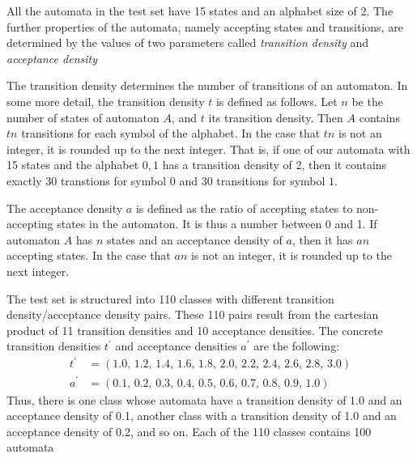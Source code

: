 All the automata in the test set have 15 states and an alphabet size of 2. The further properties of the automata, namely accepting states and transitions, are determined by the values of two parameters called \textit{transition density} and \textit{acceptance density}

The transition density determines the number of transitions of an automaton. In some more detail, the transition density $t$ is defined as follows. Let $n$ be the number of states of automaton $A$, and $t$ its transition density. Then $A$ contains $tn$ transitions for each symbol of the alphabet. In the case that $tn$ is not an integer, it is rounded up to the next integer. That is, if one of our automata with 15 states and the alphabet ${0, 1}$ has a transition density of 2, then it contains exactly 30 transtions for symbol $0$ and 30 transitions for symbol $1$. %

The acceptance density $a$ is defined as the ratio of accepting states to non-accepting states in the automaton. It is thus a number between 0 and 1. If automaton $A$ has $n$ states and an acceptance density of $a$, then it has $an$ accepting states. In the case that $an$ is not an integer, it is rounded up to the next integer. %

The \goal{} test set is structured into 110 classes with different transition density/acceptance density pairs. These 110 pairs result from the cartesian product of 11 transition densities and 10 acceptance densities. The concrete transition densities $t^\prime$ and acceptance densities $a^\prime$ are the following:
\begin{align*}
t^\prime & = \left( 1.0,\,1.2,\,1.4,\,1.6,\,1.8,\,2.0,\,2.2,\,2.4,\,2.6,\,2.8,\,3.0 \right) \\
a^\prime & = \left( 0.1,\,0.2,\,0.3,\,0.4,\,0.5,\,0.6,\,0.7,\,0.8,\,0.9,\,1.0 \right)
\end{align*}
Thus, there is one class whose automata have a transition density of 1.0 and an acceptance density of 0.1, another class with a transition density of 1.0 and an acceptance density of 0.2, and so on. Each of the 110 classes contains 100 automata

